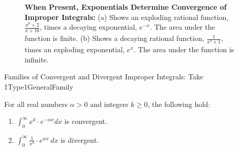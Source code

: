 \begin{figure}[htb]%
\centering
\hfill
{}%
\hfill%
%
\hspace*{1cm}
    \caption[]{\textbf{When Present, Exponentials Determine Convergence of Improper Integrals:} (a) Shows an exploding rational function, $\frac{x^8+2}{x + 10}$, times a decaying exponential, $e^{-x}$. The area under the function is finite. (b) Shows a decaying rational function, $\frac{1}{x^4 + 1}$, times an exploding exponential, $e^x$. The area under the function is infinite.}
    \label{fig:ConvergentDivergentFamiliesImproperIntegrals}
\end{figure}

\bigskip

\begin{propColor}{Families of Convergent and Divergent Improper Integrals: Take 1}{Type1GeneralFamily}

For all real numbers $\alpha>0$ and integers $k \ge 0$, the following hold:

\begin{enumerate}
\renewcommand{\labelenumi}{(\alph{enumi})}
\setlength{\itemsep}{.2cm}
    \item $\int_0^\infty x^k \cdot e^{-\alpha x} dx$ is convergent.

    \item  $\int_0^\infty  \frac{1}{x^k} \cdot e^{\alpha x} \, dx$ is divergent.

     \end{enumerate}
\bigskip
    
\end{propColor}

